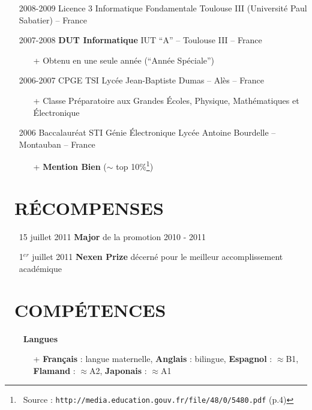 \documentclass{res}
\begin{document}
\begin{resume}
\begin{itemize}
\item[] 2008-2009 \tabto{2cm} Licence 3 Informatique Fondamentale \hfill Toulouse III (Universit\'e Paul Sabatier) -- France

\item[] 2007-2008 \tabto{2cm} \textbf{DUT Informatique} \hfill IUT ``A'' -- Toulouse III -- France
	\begin{itemize}
		\item[+] Obtenu en une seule ann\'ee (``Ann\'ee Sp\'eciale'')
	\end{itemize}

\item[] 2006-2007 \tabto{2cm} CPGE TSI \hfill Lyc\'ee Jean-Baptiste Dumas -- Al\`es -- France
	\begin{itemize}
		\item[+] Classe Pr\'eparatoire aux Grandes \'Ecoles, Physique, Math\'ematiques et \'Electronique
	\end{itemize}
	
\item[] 2006 \tabto{2cm} Baccalaur\'eat STI G\'enie \'Electronique \hfill Lyc\'ee Antoine Bourdelle -- Montauban -- France
	\begin{itemize}
		\item[+] \textbf{Mention Bien} ($\sim$ top 10\%\footnote{~Source : \texttt{http://media.education.gouv.fr/file/48/0/5480.pdf} (p.4)})
	\end{itemize}
\end{itemize}

\section{\faMedal~R\'ECOMPENSES}
\begin{itemize}
	\item[] 15 juillet 2011 \tabto{4cm} \textbf{Major} de la promotion 2010 - 2011
	\item[] 1$^{er}$ juillet 2011 \tabto{4cm} \textbf{Nexen Prize} d\'ecern\'e pour le meilleur accomplissement acad\'emique
\end{itemize}


\section{\faLayerGroup~COMP\'ETENCES}
	\begin{itemize}
		\item[] \faLanguage~\textbf{Langues}
		\begin{itemize}
                 \item[+]  \textbf{Fran\c{c}ais} : langue maternelle, \textbf{Anglais} : bilingue, \textbf{Espagnol} : $\approx$B1, \textbf{Flamand} : $\approx$A2, \textbf{Japonais} : $\approx$A1
		\end{itemize}	
	\end{itemize}
	

\end{resume}
\end{document}
